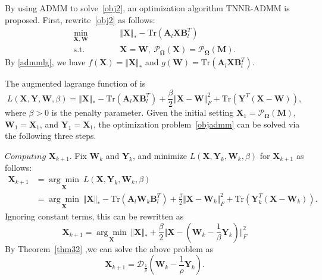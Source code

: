 \documentclass{article}
\begin{document}
{By using ADMM to solve~\eqref{obj2}, an optimization algorithm TNNR-ADMM is proposed. First, rewrite~\eqref{obj2} as follows:
\begin{equation}
    \begin{aligned}
        \underset{\mathbf X,\mathbf W}{\min}\qquad&\quad \Vert\mathbf X \Vert_* - \text{Tr}(\mathbf A_l\mathbf X\mathbf B_l^T) \\
        \text{s.t.}\qquad&\quad \mathbf X=\mathbf W, \ \mathcal{P}_{\mathbf\Omega}(\mathbf X) =  \mathcal{P}_{\mathbf\Omega}(\mathbf M).
    \end{aligned}\label{objadmm}
\end{equation}
By \eqref{admmlg}, we have $f(\mathbf X)=\Vert\mathbf X \Vert_*$ and $g(\mathbf W) = \text{Tr}(\mathbf A_l\mathbf X\mathbf B_l^T)$. 

The augmented lagrange function of is 
\begin{equation}
    L(\mathbf X,\mathbf Y,\mathbf W,\beta) = \Vert\mathbf X \Vert_* - \text{Tr}(\mathbf A_l\mathbf X\mathbf B_l^T) + \frac{\beta}{2}\Vert\mathbf X-\mathbf W \Vert_F^2 + \text{Tr}(\mathbf Y^T(\mathbf X-\mathbf W)),
\end{equation}
where $\beta > 0$ is  the penalty parameter. Given the initial setting $\mathbf X_1 = \mathcal{P}_{\mathbf\Omega}(\mathbf M)$, $\mathbf W_1 =\mathbf X_1$, and $\mathbf Y_1 =\mathbf X_1$, the optimization problem~\eqref{objadmm} can be solved via the following three steps.

$\textit{Computing}$  $\mathbf X_{k+1}$. Fix $\mathbf W_k$ and $\mathbf Y_k$, and minimize $L(\mathbf X,\mathbf Y_k,\mathbf W_k,\beta)$ for $\mathbf X_{k+1}$ as follows:
\begin{equation}
\begin{aligned}
    \mathbf X_{k+1} & =\underset{\mathbf X}{\arg\min}\ L(\mathbf X,\mathbf Y_k, \mathbf W_k,\beta) \\
    & =  \underset{\mathbf X}{\arg\min} \ \Vert\mathbf X \Vert_* - \text{Tr}(\mathbf A_l\mathbf W_k\mathbf B_l^T)    + \frac{\beta}{2}\Vert\mathbf X-\mathbf W_k \Vert_F^2 + \text{Tr}(\mathbf Y_k^T(\mathbf X-\mathbf W_k)).
\end{aligned}
\end{equation}
Ignoring constant terms, this can be rewritten as 
\begin{equation}
    \mathbf X_{k+1} = \underset{\mathbf X}{\arg\min} \ \Vert\mathbf X \Vert_* + \frac{\beta}{2} \Vert\mathbf X-\left(\mathbf W_k - \frac{1}{\beta}\mathbf Y_k \right) \Vert_F^2
\end{equation}
By Theorem~\ref{thm32} ,we can solve the above problem as
\begin{equation}
    \mathbf X_{k+1} = \mathcal{D}_{\frac{1}{\rho}}(\mathbf W_k - \frac{1}{\rho}\mathbf Y_k).
\label{admmx}
\end{equation}


}
\end{document}
